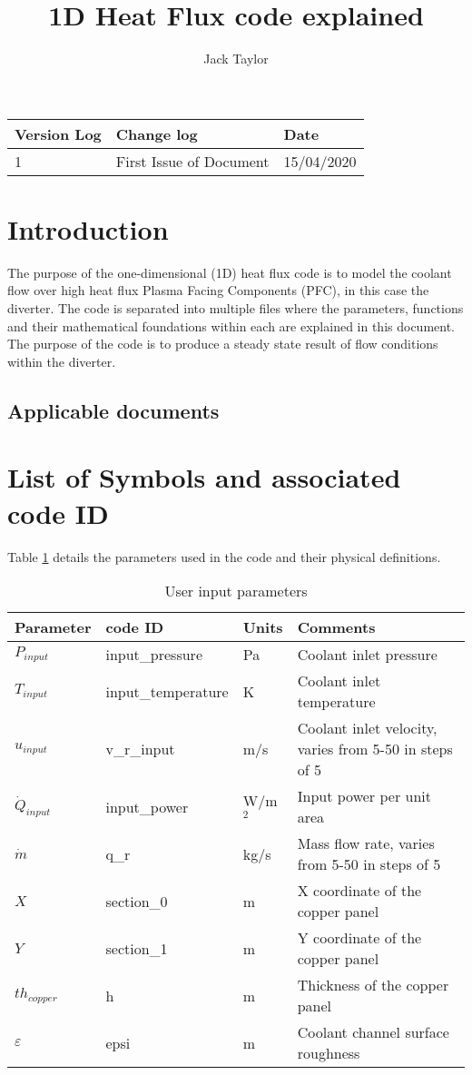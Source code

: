\documentclass{article}
\title{1D Heat Flux code explained}
\author{Jack Taylor}
\begin{document}
\maketitle

\newpage
\begin{tabular}{|p{2cm}|p{9cm}|p{2cm}|}
	\hline
	Version Log & Change log & Date \\
	\hline
	1 & First Issue of Document & 15/04/2020 \\
	\hline
\end{tabular}

\newpage
\section{Introduction}
The purpose of the one-dimensional (1D) heat flux code is to model the coolant flow over high heat flux Plasma Facing Components (PFC), in this case the diverter. The code is separated into multiple files where the parameters, functions and their mathematical foundations within each are explained in this document. The purpose of the code is to produce a steady state result of flow conditions within the diverter.

\subsection{Applicable documents}

\newpage
\section{List of Symbols and associated code ID}
Table \ref{tab:caption} details the parameters used in the code and their physical definitions.
\begin{table}[H]
	\centering
	\begin{tabular}{|p{2cm}|p{3cm}|p{1cm}|p{7cm}|}
		\hline
		\cellcolor{black!10} Parameter & \cellcolor{black!10} code ID & \cellcolor{black!10} Units & \cellcolor{black!10} Comments \\
		\hline
		$P_{input}$ & input\_pressure & Pa & Coolant inlet pressure \\
		\hline
		$T_{input}$ & input\_temperature & K & Coolant inlet temperature \\
		\hline
		$u_{input}$ & v\_r\_input & m/s & Coolant inlet velocity, varies from 5-50 in steps of 5 \\
		\hline
		$\dot{Q}_{input}$ & input\_power & W/m$^{2}$ & Input power per unit area\\
		\hline
		$\dot{m}$ & q\_r & kg/s & Mass flow rate, varies from 5-50 in steps of 5 \\
		\hline
		$X$ & section\_0 & m & X coordinate of the copper panel \\
		\hline
		$Y$ & section\_1 & m & Y coordinate of the copper panel \\
		\hline
		$th_{copper}$ & h & m & Thickness of the copper panel \\
		\hline
		$\varepsilon$ & epsi & m & Coolant channel surface roughness \\
		\hline
	\end{tabular}
	\caption{User input parameters}
	\label{tab:caption}
\end{table}
\end{document}

